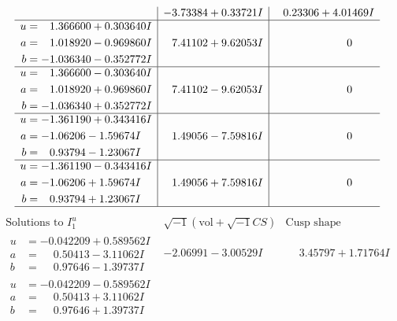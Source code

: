 \documentclass[1p]{elsarticle_modified}
\theoremstyle{definition}
\newcommand{\I}{\sqrt{-1}}
\begin{document}
$$\begin{array}{c|c|c}
 & -3.73384 + 0.33721 I & \phantom{-}0.23306 + 4.01469 I \\ \hline\begin{aligned}
u &= \phantom{-}1.366600 + 0.303640 I \\
a &= \phantom{-}1.018920 - 0.969860 I \\
b &= -1.036340 - 0.352772 I\end{aligned}
 & \phantom{-}7.41102 + 9.62053 I & \phantom{-0.000000 } 0 \\ \hline\begin{aligned}
u &= \phantom{-}1.366600 - 0.303640 I \\
a &= \phantom{-}1.018920 + 0.969860 I \\
b &= -1.036340 + 0.352772 I\end{aligned}
 & \phantom{-}7.41102 - 9.62053 I & \phantom{-0.000000 } 0 \\ \hline\begin{aligned}
u &= -1.361190 + 0.343416 I \\
a &= -1.06206 - 1.59674 I \\
b &= \phantom{-}0.93794 - 1.23067 I\end{aligned}
 & \phantom{-}1.49056 - 7.59816 I & \phantom{-0.000000 } 0 \\ \hline\begin{aligned}
u &= -1.361190 - 0.343416 I \\
a &= -1.06206 + 1.59674 I \\
b &= \phantom{-}0.93794 + 1.23067 I\end{aligned}
 & \phantom{-}1.49056 + 7.59816 I & \phantom{-0.000000 } 0\\
 \hline 
 \end{array}$$\newpage$$\begin{array}{c|c|c}  
\text{Solutions to }I^u_{1}& \I (\text{vol} + \sqrt{-1}CS) & \text{Cusp shape}\\
 \hline 
\begin{aligned}
u &= -0.042209 + 0.589562 I \\
a &= \phantom{-}0.50413 - 3.11062 I \\
b &= \phantom{-}0.97646 - 1.39737 I\end{aligned}
 & -2.06991 - 3.00529 I & \phantom{-}3.45797 + 1.71764 I \\ \hline\begin{aligned}
u &= -0.042209 - 0.589562 I \\
a &= \phantom{-}0.50413 + 3.11062 I \\
b &= \phantom{-}0.97646 + 1.39737 I\end{aligned}

\end{array}$$
\end{document}
